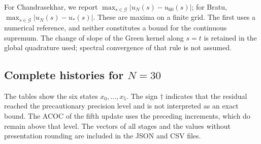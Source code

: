 \documentclass[11pt,a4paper]{article}
\numberwithin{equation}{section}
\numberwithin{table}{section}
\theoremstyle{plain}
\theoremstyle{definition}\newtheorem{definition}[theorem]{Definition}
\theoremstyle{remark}\newtheorem{remark}[theorem]{Remark}
\begin{document}
For Chandrasekhar, we report
$\max_{s\in\mathcal G}|u_N(s)-u_{60}(s)|$; for Bratu,
$\max_{s\in\mathcal G}|u_N(s)-u_*(s)|$.
These are maxima on a finite grid. The first uses a numerical
reference, and neither constitutes a bound for the continuous
supremum. The change of slope of the Green kernel along $s=t$ is
retained in the global quadrature used; spectral convergence of
that rule is not assumed.

\subsection{Complete histories for \texorpdfstring{$N=30$}{N=30}}
The tables show the six states $x_0,\ldots,x_5$.
The sign $\dagger$ indicates that the residual reached the
precautionary precision level and is not interpreted as an exact
bound. The ACOC of the fifth update uses the preceding increments,
which do remain above that level. The vectors of all stages and
the values without presentation rounding are included in the
JSON and CSV files.
\end{document}
